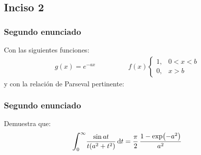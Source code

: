 \subsection{Inciso 2}

\begin{frame}
\frametitle{Segundo enunciado}
Con las siguientes funciones:
\begin{align*}
g (x) = e^{-a x} \hspace{2cm} f (x) \begin{cases}
1, & 0 < x < b \\
0, & x > b
\end{cases} 
\end{align*}
y con la relación de Parseval pertinente:
\end{frame}
\begin{frame}
\frametitle{Segundo enunciado}
Demuestra que:
\begin{align*}
\scaleint{6ex}_{\bs 0}^{\infty} \dfrac{\sin a t}{t (a^{2} + t^{2})} \dd{t} = \dfrac{\pi}{2} \, \dfrac{1 - \exp(-a^{2})}{a^{2}}
\end{align*}
\end{frame}
